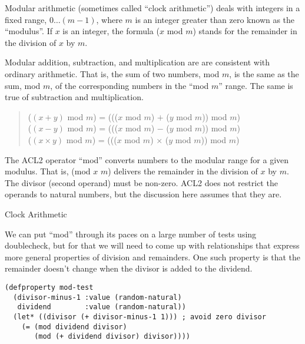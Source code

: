 \begin{aside}
Modular arithmetic (sometimes called ``clock arithmetic'')
deals with integers in a fixed range, $0 \dots (m - 1)$,
where $m$ is an integer greater than zero known as
the ``modulus''.
If $x$ is an integer, the formula ($x$ mod $m$) stands for
the remainder in the division of $x$ by $m$.

Modular addition, subtraction, and multiplication are
are consistent with ordinary arithmetic.
That is, the sum of two numbers, mod $m$,
is the same as the sum, mod $m$, of the corresponding numbers
in the ``mod $m$'' range.
The same is true of subtraction and multiplication.

\begin{quote}
($(x + y)$ mod $m$) = ((($x$ mod $m$) $+$ ($y$ mod $m$)) mod $m$) \\
($(x - y)$ mod $m$) = ((($x$ mod $m$) $-$ ($y$ mod $m$)) mod $m$) \\
($(x \times y)$ mod $m$) = ((($x$ mod $m$) $\times$ ($y$ mod $m$)) mod $m$)
\end{quote}

The ACL2 operator ``mod'' converts numbers to the modular range
for a given modulus. That is, (mod $x$ $m$) delivers the remainder
in the division of $x$ by $m$.
The divisor (second operand) must be non-zero. 
ACL2 does not restrict the operands to natural numbers, 
but the discussion here assumes that they are.
\caption{Clock Arithmetic}
\label{modular-arithmetic}
\end{aside}

We can put ``mod''
through its paces on a large number of tests using doublecheck,
but for that we will need to come up with relationships
that express more general properties of division and remainders.
One such property is that the remainder doesn't change
when the divisor is added to the dividend.

\begin{Verbatim}
(defproperty mod-test
  (divisor-minus-1 :value (random-natural)
   dividend        :value (random-natural))
  (let* ((divisor (+ divisor-minus-1 1))) ; avoid zero divisor
    (= (mod dividend divisor)
       (mod (+ dividend divisor) divisor))))
\end{Verbatim}

